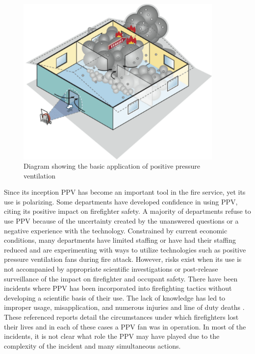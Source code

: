 \documentclass{article}
\begin{document}
\begin{figure}[H]
	\centering
	\includegraphics[width = 4in]{0_Images/Tactical_Considerations/Exhaust_Over_Cone/ppv_illistration.pdf}
	\caption{Diagram showing the basic application of positive pressure ventilation}
	\label{fig:PPV_Diagram}
\end{figure}

Since its inception PPV has become an important tool in the fire service, yet its use is polarizing. Some departments have developed confidence in using PPV, citing its positive impact on firefighter safety. A majority of departments refuse to use PPV because of the uncertainty created by the unanswered questions or a negative experience with the technology. Constrained by current economic conditions, many departments have limited staffing or have had their staffing reduced and are experimenting with ways to utilize technologies such as positive pressure ventilation fans during fire attack. However, risks exist when its use is not accompanied by appropriate scientific investigations or post-release surveillance of the impact on firefighter and occupant safety. There have been incidents where PPV has been incorporated into firefighting tactics without developing a scientific basis of their use. The lack of knowledge has led to improper usage, misapplication, and numerous injuries and line of duty deaths \cite{NIOSHF2000-44} \cite{NIOSH98F-32} \cite{TexasFMFY07-02} \cite{ContraCostaFalaityInvestigation} \cite{NIOSHF2004-02} \cite{NIOSHF2002-12}. These referenced reports detail the circumstances under which firefighters lost their lives and in each of these cases a PPV fan was in operation. In most of the incidents, it is not clear what role the PPV may have played due to the complexity of the incident and many simultaneous actions. 
\end{document}
